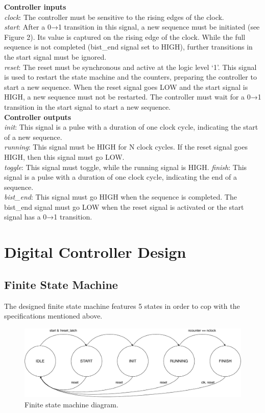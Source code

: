 \documentclass[12pt]{article}
\begin{document}
	\textbf{Controller inputs}\\
	\emph{clock}: The controller must be sensitive to the rising edges of the clock.\\
	\emph{start}: After a 0→1 transition in this signal, a new sequence must be initiated (see Figure 2). Its value is captured on the rising edge of the clock. While the full sequence is not completed (bist\_end signal set to HIGH), further transitions in the start signal must be ignored.\\
	\emph{reset}: The reset must be synchronous and active at the logic level ‘1’. This signal is used to restart the state machine and the counters, preparing the controller to start a new sequence. When the reset signal goes LOW and the start signal is HIGH, a new sequence must not be restarted. The controller must wait for a 0→1 transition in the start signal to start a new sequence.\\
    \:
    \newpage
	\textbf{Controller outputs}\\
	\emph{init}: This signal is a pulse with a duration of one clock cycle, indicating the start of a new sequence.\\
	\emph{running}: This signal must be HIGH for N clock cycles. If the reset signal goes HIGH, then this signal must go LOW.\\
    \emph{toggle}: This signal must toggle, while the running signal is HIGH.
    \emph{finish}: This signal is a pulse with a duration of one clock cycle, indicating the end of a sequence.\\
    \emph{bist\_end}: This signal must go HIGH when the sequence is completed. The bist\_end signal must go LOW when the reset signal is activated or the start signal has a 0→1 transition.

	
	
	

	
    \section{Digital Controller Design}
	\subsection*{Finite State Machine}
	
	The designed finite state machine features 5 states in order to cop with the specifications mentioned above.
	
	\begin{figure}[!htb]
        \centering
        \includegraphics[scale=0.5]{PTFSE_FSM.pdf}
            \caption{Finite state machine diagram.}
            \label{fig:FSMdiagram}
        \end{figure}
\end{document}
